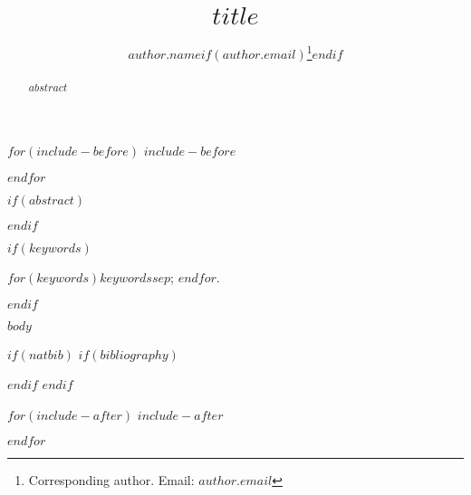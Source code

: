 \documentclass[letterpaper, inpress]{jds} %
\title[$shorttitle$]{$title$}
\author[$author.affiliation$]{$author.name$$if(author.email)$\thanks{Corresponding author. Email: $author.email$}$endif$}
\affil[$affiliation.id$]{$affiliation.institution$}
\begin{document}
$for(include-before)$
$include-before$

$endfor$


\maketitle

$if(abstract)$
\begin{abstract}
  $abstract$
\end{abstract}
$endif$

$if(keywords)$
\begin{keywords} %
  $for(keywords)$$keywords$$sep$; $endfor$.
\end{keywords}
$endif$


$body$

$if(natbib)$
$if(bibliography)$


$endif$
$endif$

$for(include-after)$
$include-after$

$endfor$
\end{document}

